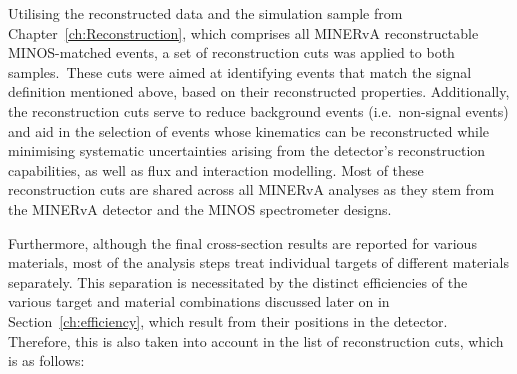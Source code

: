 Utilising the reconstructed data and the simulation sample from Chapter~\ref{ch:Reconstruction}, which comprises all MINERvA reconstructable MINOS-matched events, a set of reconstruction cuts was applied to both samples.~These cuts were aimed at identifying events that match the signal definition mentioned above, based on their reconstructed properties. Additionally, the reconstruction cuts serve to reduce background events (i.e.~non-signal events) and aid in the selection of events whose kinematics can be reconstructed while minimising systematic uncertainties arising from the detector's reconstruction capabilities, as well as flux and interaction modelling. Most of these reconstruction cuts are shared across all MINERvA analyses as they stem from the MINERvA detector and the MINOS spectrometer designs. 

Furthermore, although the final cross-section results are reported for various materials, most of the analysis steps treat individual targets of different materials separately. This separation is necessitated by the distinct efficiencies of the various target and material combinations discussed later on in Section~\ref{ch:efficiency}, which result from their positions in the detector. Therefore, this is also taken into account in the list of reconstruction cuts, which is as follows:
